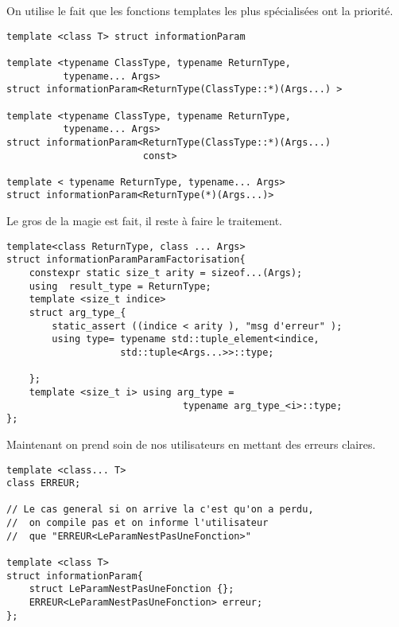 \documentclass{beamer}
\begin{document}
\begin{frame}[containsverbatim]
On utilise le fait que les fonctions templates les plus spécialisées ont la priorité.
\begin{verbatim}
template <class T> struct informationParam 

template <typename ClassType, typename ReturnType,
          typename... Args>
struct informationParam<ReturnType(ClassType::*)(Args...) >

template <typename ClassType, typename ReturnType,
          typename... Args>
struct informationParam<ReturnType(ClassType::*)(Args...)
                        const>

template < typename ReturnType, typename... Args>
struct informationParam<ReturnType(*)(Args...)>
\end{verbatim}

\end{frame} 


\begin{frame}[containsverbatim]
Le gros de la magie est fait, il reste à faire le traitement.
\begin{verbatim}
template<class ReturnType, class ... Args>
struct informationParamParamFactorisation{
    constexpr static size_t arity = sizeof...(Args);
    using  result_type = ReturnType;
    template <size_t indice>
    struct arg_type_{
        static_assert ((indice < arity ), "msg d'erreur" );
        using type= typename std::tuple_element<indice,
                    std::tuple<Args...>>::type;

    };
    template <size_t i> using arg_type = 
                               typename arg_type_<i>::type;
};
\end{verbatim}
\end{frame} 

\begin{frame}[containsverbatim]
Maintenant on prend soin de nos utilisateurs en mettant des erreurs claires. 
\begin{verbatim}
template <class... T>
class ERREUR;

// Le cas general si on arrive la c'est qu'on a perdu,
//  on compile pas et on informe l'utilisateur
//  que "ERREUR<LeParamNestPasUneFonction>"

template <class T>
struct informationParam{
    struct LeParamNestPasUneFonction {};
    ERREUR<LeParamNestPasUneFonction> erreur;
};
\end{verbatim}
\end{frame}
\end{document}
